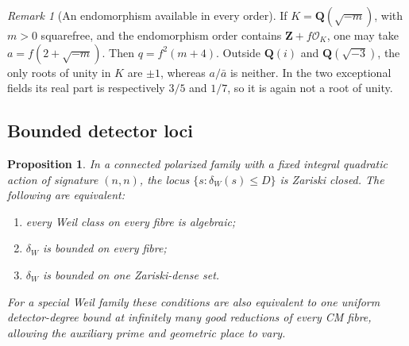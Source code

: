 \documentclass[11pt]{article}
\newtheorem{proposition}[theorem]{Proposition}
\theoremstyle{definition}
\theoremstyle{remark}
\newtheorem{remark}[theorem]{Remark}
\newcommand{\Q}{\mathbf Q}
\newcommand{\Z}{\mathbf Z}
\begin{document}
\begin{remark}[An endomorphism available in every order]\label{rem:order-endomorphism}
If $K=\Q(\sqrt{-m})$, with $m>0$ squarefree, and the endomorphism order contains $\Z+f\mathcal O_K$, one may take $a=f(2+\sqrt{-m})$. Then $q=f^2(m+4)$. Outside $\Q(i)$ and $\Q(\sqrt{-3})$, the only roots of unity in $K$ are $\pm1$, whereas $a/\bar a$ is neither. In the two exceptional fields its real part is respectively $3/5$ and $1/7$, so it is again not a root of unity.
\end{remark}

\subsection{Bounded detector loci}

\begin{proposition}\label{prop:detector-loci}
In a connected polarized family with a fixed integral quadratic action of signature $(n,n)$, the locus $\{s:\delta_W(s)\leq D\}$ is Zariski closed. The following are equivalent:
\begin{enumerate}[label=\textnormal{(\roman*)}]
\item every Weil class on every fibre is algebraic;
\item $\delta_W$ is bounded on every fibre;
\item $\delta_W$ is bounded on one Zariski-dense set.
\end{enumerate}
For a special Weil family these conditions are also equivalent to one uniform detector-degree bound at infinitely many good reductions of every CM fibre, allowing the auxiliary prime and geometric place to vary.
\end{proposition}
\end{document}
